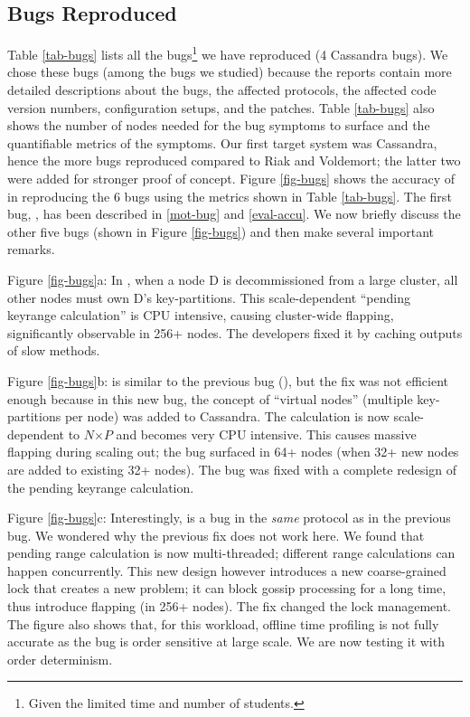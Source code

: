 

\subsection{Bugs Reproduced}
\label{eval-bugs}



Table \ref{tab-bugs} lists all the \numEval bugs\footnote{Given the limited
time and number of students.}   we have reproduced (4
Cassandra bugs).
We chose these \numEval bugs
(among the \numStudy bugs we studied) because the reports contain 
more detailed
descriptions about the bugs, the affected protocols, the affected code
version numbers, configuration setups, and the patches.  Table
\ref{tab-bugs} also shows the number of nodes needed for the bug symptoms
to surface and the quantifiable metrics of the symptoms.
%
Our first target system was Cassandra, hence the more bugs reproduced
compared to Riak and Voldemort; the latter two were added for  stronger
proof of concept.
%
Figure \ref{fig-bugs} shows the accuracy of \sck in reproducing the 6 bugs
using the metrics shown in Table \ref{tab-bugs}.
%
The first bug, \caone, has been described in \sec\ref{mot-bug} and
\sec\ref{eval-accu}.
%
We now briefly discuss the other five bugs 
(shown in Figure \ref{fig-bugs}) and then
%
make several important remarks.


Figure \ref{fig-bugs}a: In \catwo \cite{CA-Two}, 
when a node D is decommissioned from a
large cluster, all other nodes must own D's key-partitions.
This scale-dependent ``pending keyrange calculation'' is CPU intensive,
causing cluster-wide flapping, significantly observable in 256+ nodes.
The developers fixed it by caching outputs of slow methods.

Figure \ref{fig-bugs}b: \catri \cite{CA-Tri} 
is similar to the previous bug (\catwo),
but the fix was not efficient enough because in this new bug, the concept
of ``virtual nodes'' (multiple key-partitions per node) was added to
Cassandra.  The calculation is now scale-dependent to $N$$\times$$P$ and
becomes very CPU intensive.  This causes massive flapping during scaling out; 
the bug surfaced in 64+ nodes (when 32+ new nodes are added
to existing 32+ nodes). The bug was fixed with a complete 
redesign of the pending keyrange calculation.
%






Figure \ref{fig-bugs}c: Interestingly, \cafour \cite{CA-Four} is 
a bug in the {\em same}
protocol as in the previous bug.  We wondered why the previous fix does
not work here.  We found that pending range calculation is now
multi-threaded; different range calculations can happen concurrently.
This new design however introduces a new coarse-grained lock that creates
a new problem;  it can block gossip processing for a long
time, thus introduce flapping (in 256+ nodes).  The fix changed the
lock management.
%
The figure also shows that, for this workload, offline time profiling
is not fully accurate as the bug is order sensitive at large scale.
We are now testing it with order determinism. 


